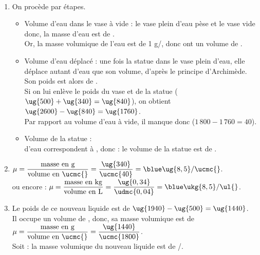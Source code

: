 \ \\ [-5mm]
   \begin{enumerate}
      \item On procède par étapes.
         \begin{itemize}
            \item Volume d'eau dans le vase à vide : le vase plein d'eau pèse  et le vase vide  donc, la masse d'eau est de . \\
            Or, la masse volumique de l'eau est de 1 g/\ucmc{}, donc  ont un volume de .
            \item Volume d'eau déplacé : une fois la statue dans le vase plein d'eau, elle déplace autant d'eau que son volume, d'après le principe d'Archimède. Son poids est alors de . \\
            Si on lui enlève le poids du vase et de la statue ($\ug{500}+ \ug{340} =\ug{840}$), on obtient $\ug{2600}-\ug{840} =\ug{1760}$. \\
            Par rapport au volume d'eau à vide, il manque donc  ($1\,800-1\,760 = 40$).
            \item Volume de la statue : \\
                d'eau correspondent à , donc : {\blue le volume de la statue est de }.
         \end{itemize}
         \medskip
         \item $\mu=\dfrac{\text{masse en g}}{\text{volume en \ucmc{}}} =\dfrac{\ug{340}}{\ucmc{40}} ={\blue\ug{8,5}\slash \ucmc{}}$. \\ [1mm]
            ou encore : $\mu=\dfrac{\text{masse en kg}}{\text{volume en L}} =\dfrac{\ug{0,34}}{\udmc{0,04}} ={\blue \ukg{8,5}\slash\ul{}}$. \\
         \medskip
         \item Le poids de ce nouveau liquide est de $\ug{1940}-\ug{500} =\ug{1440}$. \\
            Il occupe un volume de , donc, sa masse volumique est de $\mu=\dfrac{\text{masse en g}}{\text{volume en \ucmc{}}} =\dfrac{\ug{1440}}{\ucmc{1800}}$. \\
             Soit : {\blue la masse volumique du nouveau liquide est de \slash\ucmc{}.}
   \end{enumerate}
